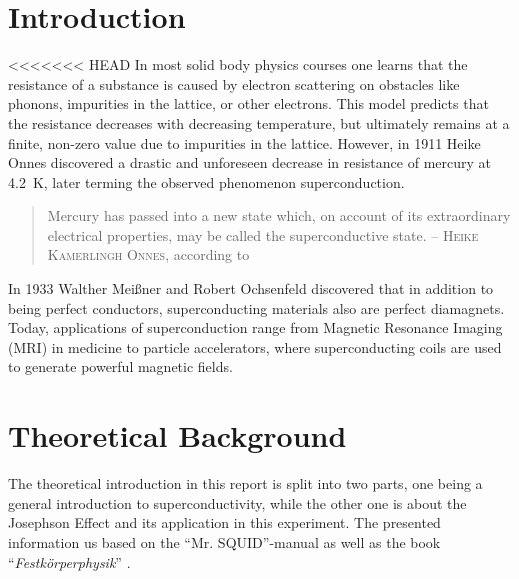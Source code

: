 \documentclass[a4paper,10pt]{article}
\begin{document}
\section{Introduction}
<<<<<<< HEAD
In most solid body physics courses one learns that the resistance of a substance is caused by electron scattering on obstacles like phonons, impurities in the lattice, or other electrons.\cite{grossmarx} This model predicts that the resistance decreases with decreasing temperature, but ultimately remains at a finite, non-zero value due to impurities in the lattice. 
However, in 1911 Heike Onnes discovered a drastic and unforeseen decrease in resistance of mercury at \SI{4.2}{\kelvin}, later terming the observed phenomenon superconduction. 
\begin{quote}
    Mercury has passed into a new state which, on account of its extraordinary electrical properties, may be called the superconductive state. \newline
    -- \textsc{Heike Kamerlingh Onnes}, according to \cite{grossmarx}
\end{quote} 
In 1933 Walther Meißner and Robert Ochsenfeld discovered that in addition to being perfect conductors, superconducting materials also are perfect diamagnets. Today, applications of superconduction range from Magnetic Resonance Imaging (MRI) in medicine to particle accelerators, where superconducting coils are used to generate powerful magnetic fields.\cite{grossmarx}

\section{Theoretical Background}

The theoretical introduction in this report is split into two parts, one being a general introduction to superconductivity, while the other one is about the Josephson Effect and its application in this experiment. The presented information us based on the ``Mr. SQUID''-manual \cite{skriptum} as well as the book ``\textit{Festkörperphysik}'' \cite{grossmarx}.
\end{document}
